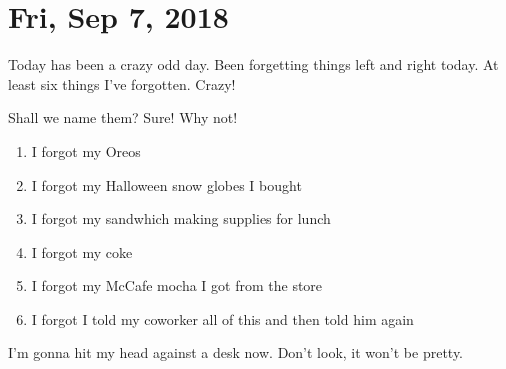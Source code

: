 \section{Fri, Sep 7, 2018}

Today has been a crazy odd day. Been forgetting things left and right today. At least
six things I've forgotten. Crazy!

Shall we name them? Sure! Why not!

\begin{enumerate}
\item I forgot my Oreos
\item I forgot my Halloween snow globes I bought
\item I forgot my sandwhich making supplies for lunch
\item I forgot my coke
\item I forgot my McCafe mocha I got from the store
\item I forgot I told my coworker all of this and then told him again
\end{enumerate}

I'm gonna hit my head against a desk now. Don't look, it won't be pretty.